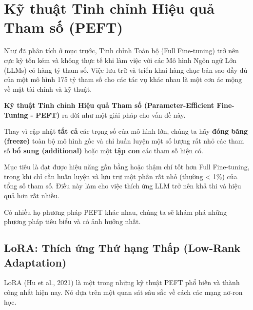 
\section{Kỹ thuật Tinh chỉnh Hiệu quả Tham số (PEFT)}
\label{sec:peft}

Như đã phân tích ở mục trước, Tinh chỉnh Toàn bộ (Full Fine-tuning) trở nên cực kỳ tốn kém và không thực tế khi làm việc với các Mô hình Ngôn ngữ Lớn (LLMs) có hàng tỷ tham số. Việc lưu trữ và triển khai hàng chục bản sao đầy đủ của một mô hình 175 tỷ tham số cho các tác vụ khác nhau là một cơn ác mộng về mặt tài chính và kỹ thuật.

\textbf{Kỹ thuật Tinh chỉnh Hiệu quả Tham số (Parameter-Efficient Fine-Tuning - PEFT)} ra đời như một giải pháp cho vấn đề này.

\begin{tcolorbox}[
    title=Triết lý của PEFT,
    colback=green!5!white, colframe=green!60!black, fonttitle=\bfseries
]
Thay vì cập nhật \textbf{tất cả} các trọng số của mô hình lớn, chúng ta hãy \textbf{đóng băng (freeze)} toàn bộ mô hình gốc và chỉ huấn luyện một số lượng rất nhỏ các tham số \textbf{bổ sung (additional)} hoặc một \textbf{tập con} các tham số hiện có.
\end{tcolorbox}

Mục tiêu là đạt được hiệu năng gần bằng hoặc thậm chí tốt hơn Full Fine-tuning, trong khi chỉ cần huấn luyện và lưu trữ một phần rất nhỏ (thường < 1\%) của tổng số tham số. Điều này làm cho việc thích ứng LLM trở nên khả thi và hiệu quả hơn rất nhiều.

Có nhiều họ phương pháp PEFT khác nhau, chúng ta sẽ khám phá những phương pháp tiêu biểu và có ảnh hưởng nhất.

\subsection{LoRA: Thích ứng Thứ hạng Thấp (Low-Rank Adaptation)}
\label{ssec:lora}
LoRA (Hu et al., 2021) \cite{hu2021lora} là một trong những kỹ thuật PEFT phổ biến và thành công nhất hiện nay. Nó dựa trên một quan sát sâu sắc về cách các mạng nơ-ron học.


